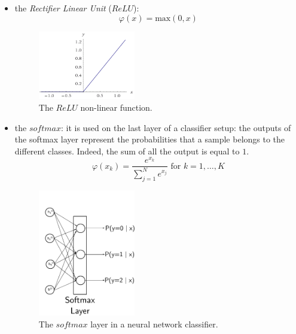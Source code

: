 \begin{itemize}
\item the \textit{ Rectifier Linear Unit} ($ReLU$):
\begin{equation}
\varphi(x) = \text{max}(0,x)
\end{equation}
\begin{figure}[t]
\centering
	\includegraphics[width=0.4\textwidth]{img/relu}
	\caption{The $ReLU$ non-linear function.}
\end{figure}

\item the $softmax$: it is used on the last layer of a classifier setup: the outputs of the softmax layer represent the probabilities that a sample belongs to the different classes. Indeed, the sum of all the output is equal to $1$.
\begin{equation}
\varphi(x_k) = \frac{e^{x_k}}{\sum_{j=1}^{N}e^{x_j}} \text{ for }  k=1,\dots,K
\end{equation}
\begin{figure}[t]
\centering
	\includegraphics[width=0.4\textwidth]{img/softmax}
	\caption{The $\textit{softmax}$ layer in a neural network classifier.}
\end{figure}	
			
			

\end{itemize}
